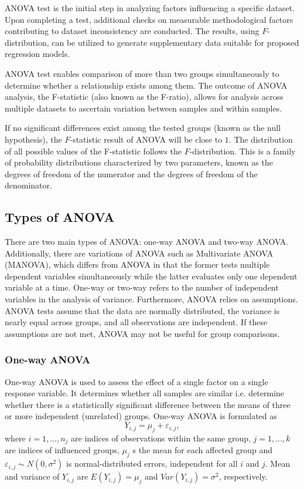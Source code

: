 ANOVA test is the initial step in analyzing factors influencing a specific dataset. Upon completing a test, additional checks on measurable methodological factors contributing to dataset inconsistency are conducted. The results, using $F$-distribution, can be utilized to generate supplementary data suitable for proposed regression models.

ANOVA test enables comparison of more than two groups simultaneously to determine whether a relationship exists among them. The outcome of ANOVA analysis, the F-statistic (also known as the F-ratio), allows for analysis across multiple datasets to ascertain variation between samples and within samples.

If no significant differences exist among the tested groups (known as the null hypothesis), the $F$-statistic result of ANOVA will be close to $1$. The distribution of all possible values of the F-statistic follows the $F$-distribution. This is a family of probability distributions characterized by two parameters, known as the degrees of freedom of the numerator and the degrees of freedom of the denominator.

\subsection{Types of ANOVA}

There are two main types of ANOVA: one-way ANOVA and two-way ANOVA. Additionally, there are variations of ANOVA such as  Multivariate ANOVA (MANOVA), which differs from ANOVA in that the former tests multiple dependent variables simultaneously while the latter evaluates only one dependent variable at a time. One-way or two-way refers to the number of independent variables in the analysis of variance. Furthermore, ANOVA relies on assumptions. ANOVA tests assume that the data are normally distributed, the variance is nearly equal across groups, and all observations are independent. If these assumptions are not met, ANOVA may not be useful for group comparisons.

\subsubsection{One-way ANOVA}
One-way ANOVA is used to assess the effect of a single factor on a single response variable. It determines whether all samples are similar i.e. determine whether there is a statistically significant difference between the means of three or more independent (unrelated) groups. One-way ANOVA is formulated as
\begin{equation}
 Y_{i,j}=\mu_j + \varepsilon_{i,j},
\end{equation}
where $i=1,\ldots,n_j$ are indices of observations within the same group, $j=1,\ldots,k$ are indices of influenced groups, $\mu_j$ s the mean for each affected group and $\varepsilon_{i,j} \sim N(0,\sigma^2)$ is normal-distributed errors, independent for all $i$ and $j$. Mean and variance of $Y_{i,j}$ are $E(Y_{i,j})=\mu_j$ and $Var(Y_{i,j})=\sigma^2$, respectively.

